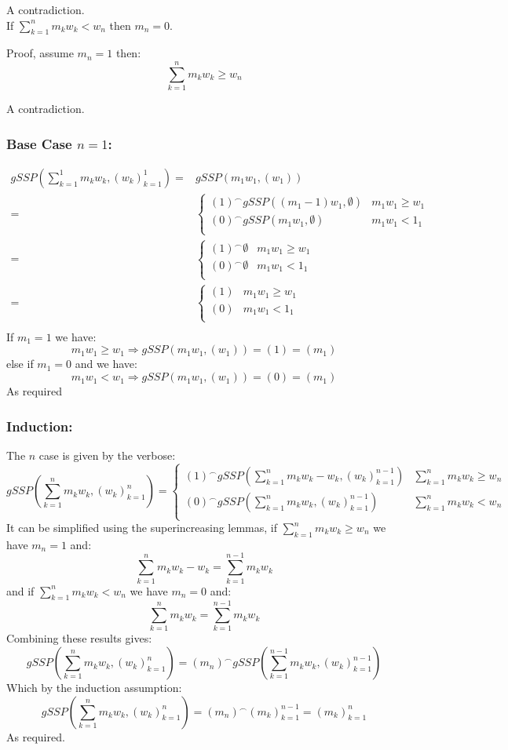 A contradiction.
\\
If $\sum_{k=1}^nm_kw_k < w_n$ then $m_n = 0$.

Proof, assume $m_n = 1$ then:
\[\sum_{k=1}^nm_kw_k \geq w_n\]

A contradiction.
\subsubsection{Base Case $n=1$:}

\begin{equation*}
\begin{aligned}
	gSSP\left(\sum_{k=1}^1m_kw_k,(w_k)_{k=1}^1\right) 
	=&gSSP\left(m_1w_1,(w_1)\right)\\
	=&\begin{cases} 
		(1)^\frown gSSP((m_1-1)w_1,\emptyset) & m_1w_1 \geq w_1\\
		(0)^\frown gSSP(m_1w_1,\emptyset) & m_1w_1 < 1_1\\
	\end{cases}\\
	=&\begin{cases} 
		(1)^\frown \emptyset & m_1w_1 \geq w_1\\
		(0)^\frown \emptyset & m_1w_1 < 1_1\\
	\end{cases}\\
	=&\begin{cases} 
	(1) & m_1w_1 \geq w_1\\
		(0) & m_1w_1 < 1_1\\
	\end{cases}\\
\end{aligned}
\end{equation*}
If $m_1=1$ we have:
\[m_1w_1\geq w_1 \Rightarrow gSSP(m_1w_1,(w_1)) = (1) = (m_1)\]
else if $m_1=0$ and we have:
\[m_1w_1 < w_1 \Rightarrow gSSP(m_1w_1,(w_1)) = (0) = (m_1)\]
As required 

\subsubsection{Induction:}
The $n$ case is given by the verbose:
\[gSSP\left(\sum_{k=1}^nm_kw_k,(w_k)_{k=1}^n\right) = 
	\begin{cases}
	(1)^\frown gSSP\left(\sum_{k=1}^nm_kw_k-w_k,(w_k)_{k=1}^{n-1}\right)& \sum_{k=1}^nm_kw_k \geq w_n \\
	(0)^\frown gSSP\left(\sum_{k=1}^nm_kw_k,(w_k)_{k=1}^{n-1}\right)& \sum_{k=1}^nm_kw_k < w_n \\
	\end{cases}
\]
It can be simplified using the superincreasing lemmas,
if $\sum_{k=1}^nm_kw_k \geq w_n $ we have $m_n = 1$ and:
\[\sum_{k=1}^nm_kw_k -w_k = \sum_{k=1}^{n-1}m_kw_k\]
and if $\sum_{k=1}^nm_kw_k < w_n $ we have $m_n = 0$ and:
\[\sum_{k=1}^nm_kw_k = \sum_{k=1}^{n-1}m_kw_k\]
Combining these results gives:
\[gSSP\left(\sum_{k=1}^nm_kw_k,(w_k)_{k=1}^n\right) = 
(m_n)^\frown gSSP\left(\sum_{k=1}^{n-1}m_kw_k,(w_k)_{k=1}^{n-1}\right)
\]
Which by the induction assumption:
\[gSSP\left(\sum_{k=1}^nm_kw_k,(w_k)_{k=1}^n\right) = (m_n)^\frown (m_k)_{k=1}^{n-1} = (m_k)_{k=1}^n\]
As required.

